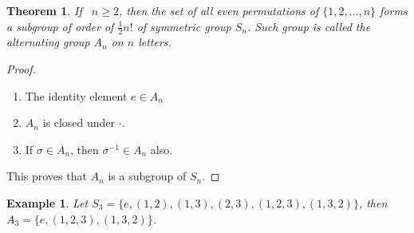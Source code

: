 \documentclass{article}
\theoremstyle{MyNonumberplain}
\theoremstyle{break}
\newtheorem*{proof}{Proof. }
\theoremstyle{break}
\newtheorem{theorem}{Theorem}[section]
\newtheorem{example}{Example}[section]
\theoremstyle{break}
\theoremstyle{definition}
\theoremstyle{break}
\begin{document}
\begin{thmbox}
    \begin{theorem}
        If \ $n \geq 2$, then the set of all even permutations of $\{1, 2, . . ., n\}$
        forms a subgroup of order of $\frac{1}{2} n!$ of
        symmetric group $S_n$. Such group is called the alternating group $A_n$ on $n$
        letters.
    \end{theorem}
    \begin{prfbox}
        \begin{proof}
            \begin{enumerate}
                \item The identity element $e \in A_n$\\
                \item $A_n$ is closed under $\cdot$.\\
                \item If $\sigma \in A_n$, then $\sigma^{- 1} \in A_n$ also.\\
            \end{enumerate}
            This proves that $A_n$ is a subgroup of $S_n$. 
        \end{proof}
    \end{prfbox}
\end{thmbox}

\begin{expbox}
    \begin{example}
        Let $S_3 = \{ e, (1, 2), (1, 3), (2, 3), (1, 2, 3), (1, 3, 2) \}$, then $A_3 =\{ e, (1, 2, 3), (1, 3, 2) \}$.
    \end{example}
\end{expbox}
\end{document}

